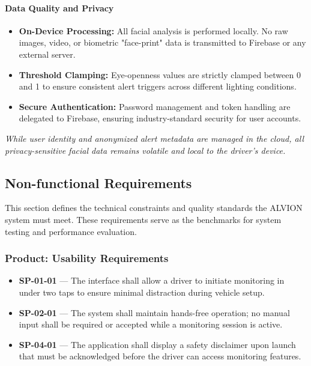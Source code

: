 \documentclass[11pt]{report}
\begin{document}
\paragraph{Data Quality and Privacy}
\begin{itemize}
    \item \textbf{On-Device Processing:} All facial analysis is performed locally. No raw images, video, or biometric "face-print" data is transmitted to Firebase or any external server.
    \item \textbf{Threshold Clamping:} Eye-openness values are strictly clamped between 0 and 1 to ensure consistent alert triggers across different lighting conditions.
    \item \textbf{Secure Authentication:} Password management and token handling are delegated to Firebase, ensuring industry-standard security for user accounts.
\end{itemize}

\textit{While user identity and anonymized alert metadata are managed in the cloud, all privacy-sensitive facial data remains volatile and local to the driver's device.}

\subsection{Non-functional Requirements}
This section defines the technical constraints and quality standards the ALVION system must meet. These requirements serve as the benchmarks for system testing and performance evaluation.

\subsubsection{Product: Usability Requirements}
\begin{itemize}
    \item \textbf{SP-01-01} — The interface shall allow a driver to initiate monitoring in under two taps to ensure minimal distraction during vehicle setup.
    \item \textbf{SP-02-01} — The system shall maintain hands-free operation; no manual input shall be required or accepted while a monitoring session is active.
    \item \textbf{SP-04-01} — The application shall display a safety disclaimer upon launch that must be acknowledged before the driver can access monitoring features.
\end{itemize}
\end{document}
